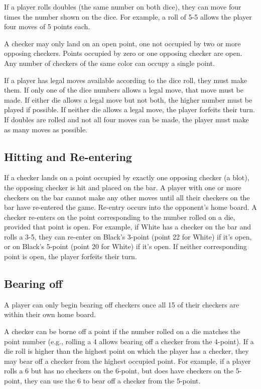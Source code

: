 If a player rolls doubles (the same number on both dice), they can move four times the number shown on the dice. 
For example, a roll of 5-5 allows the player four moves of 5 points each.

A checker may only land on an open point, one not occupied by two or more opposing checkers. 
Points occupied by zero or one opposing checker are open. Any number of checkers of the same color can occupy a single point.

If a player has legal moves available according to the dice roll, they must make them. 
If only one of the dice numbers allows a legal move, that move must be made. 
If either die allows a legal move but not both, the higher number must be played if possible. 
If neither die allows a legal move, the player forfeits their turn. 
If doubles are rolled and not all four moves can be made, the player must make as many moves as possible.

\subsection{Hitting and Re-entering}
If a checker lands on a point occupied by exactly one opposing checker (a blot), the opposing checker is hit and placed on the bar.
A player with one or more checkers on the bar cannot make any other moves until all their checkers on the bar have re-entered the game. 
Re-entry occurs into the opponent's home board. 
A checker re-enters on the point corresponding to the number rolled on a die, provided that point is open. 
For example, if White has a checker on the bar and rolls a 3-5, they can re-enter on Black's 3-point (point 22 for White) if it's open, or on Black's 5-point (point 20 for White) if it's open. 
If neither corresponding point is open, the player forfeits their turn.

\subsection{Bearing off}
A player can only begin bearing off checkers once all 15 of their checkers are within their own home board.

A checker can be borne off a point if the number rolled on a die matches the point number (e.g., rolling a 4 allows bearing off a checker from the 4-point).
If a die roll is higher than the highest point on which the player has a checker, they may bear off a checker from the highest occupied point. 
For example, if a player rolls a 6 but has no checkers on the 6-point, but does have checkers on the 5-point, they can use the 6 to bear off a checker from the 5-point.

